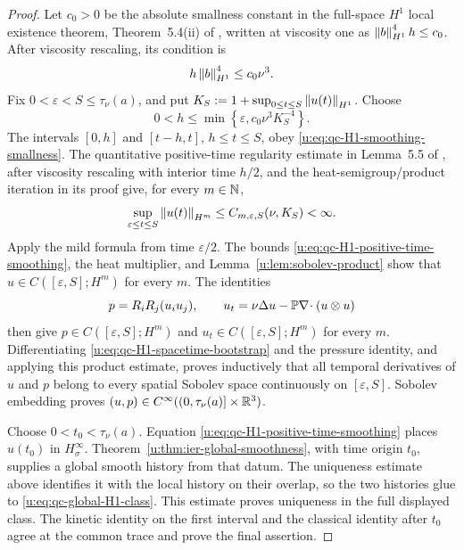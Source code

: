 \begin{proof}
Let \(c_0>0\) be the absolute smallness constant in the full-space
\(H^1\) local existence theorem, Theorem~5.4(ii) of \cite{Tao2013},
written at viscosity one as
\(\left\lVert b\right\rVert_{H^1}^4h\le c_0\).  After viscosity rescaling, its condition is
\begin{equation}
 h\left\lVert b\right\rVert_{H^1}^4\le c_0\nu^3.
 \label{u:eq:qc-H1-smoothing-smallness}
\end{equation}
Fix \(0<\varepsilon<S\le\tau_\nu(a)\), and put
\(K_S:=1+\sup_{0\le t\le S}\left\lVert u(t)\right\rVert_{H^1}\).  Choose
\[
 0<h\le\min\left\{\varepsilon,
 c_0\nu^3K_S^{-4}\right\}.
\]
The intervals \([0,h]\) and \([t-h,t]\), \(h\le t\le S\), obey
\eqref{u:eq:qc-H1-smoothing-smallness}.  The quantitative positive-time
regularity estimate in Lemma~5.5 of \cite{Tao2013}, after viscosity
rescaling with interior time \(h/2\), and the
heat-semigroup/product iteration in its proof give, for every \(m\in\mathbb N\),
\begin{equation}
 \sup_{\varepsilon\le t\le S}\left\lVert u(t)\right\rVert_{H^m}
 \le C_{m,\varepsilon,S}(\nu,K_S)<\infty.
 \label{u:eq:qc-H1-positive-time-smoothing}
\end{equation}
Apply the mild formula from time \(\varepsilon/2\).  The bounds
\eqref{u:eq:qc-H1-positive-time-smoothing}, the heat multiplier, and
Lemma~\ref{u:lem:sobolev-product} show that
\(u\in C([\varepsilon,S];H^m)\) for every \(m\).  The identities
\begin{equation}
 p=R_iR_j(u_i u_j),
 \qquad
 u_t=\nu\Delta u-\mathbb P\nabla\!\cdot(u\otimes u)
 \label{u:eq:qc-H1-spacetime-bootstrap}
\end{equation}
then give
\(p\in C([\varepsilon,S];H^m)\) and
\(u_t\in C([\varepsilon,S];H^m)\) for every \(m\).  Differentiating
\eqref{u:eq:qc-H1-spacetime-bootstrap} and the pressure identity, and applying
this product estimate, proves inductively that all temporal derivatives
of \(u\) and \(p\) belong to every spatial Sobolev space continuously on
\([\varepsilon,S]\).  Sobolev embedding proves
\((u,p)\in C^\infty((0,\tau_\nu(a)]\times\mathbb R^3)\).

Choose \(0<t_0<\tau_\nu(a)\).  Equation
\eqref{u:eq:qc-H1-positive-time-smoothing} places \(u(t_0)\) in
\(H^\infty_\sigma\).  Theorem~\ref{u:thm:ier-global-smoothness}, with time
origin \(t_0\), supplies a global smooth history from that datum.  The
uniqueness estimate above identifies it with the local history on their
overlap, so the two histories glue to \eqref{u:eq:qc-global-H1-class}.
This estimate proves uniqueness in the full displayed class.  The kinetic
identity on the first interval and the classical identity after \(t_0\) agree
at the common trace and prove the final assertion.
\end{proof}

